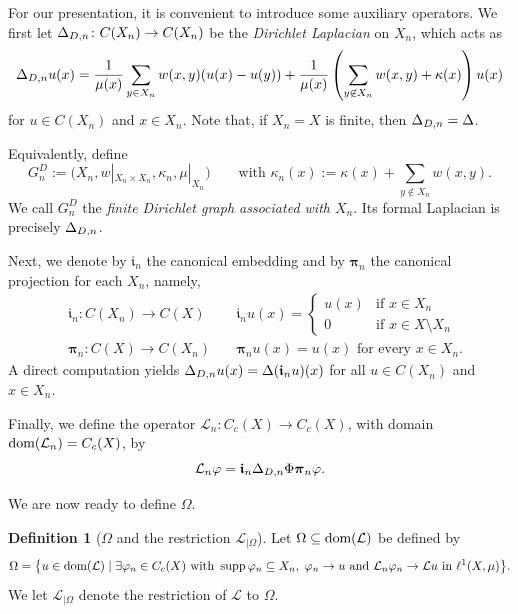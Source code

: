 \documentclass[letterpaper]{article}
\theoremstyle{definition}
\newtheorem{definition}[lemma]{Definition}
\theoremstyle{named}
\numberwithin{equation}{section}
\newcommand{\dom}{\textnormal{dom}} %
\newcommand{\Deltaphi}{\mathcal{L}}
\newcommand{\Deltaphiom}{\Deltaphi_{|\Omega}}
\newcommand{\Lmin}{\mathcal{L}_{n}}
\newcommand{\Deltadir}[1][]{\Delta_{D\ifx&#1&\else,#1\fi}}
\begin{document}
For our presentation, it is convenient to introduce some auxiliary operators. 
We first let $\Deltadir[n] \colon C(X_n) \to C(X_n)$ be the \emph{Dirichlet Laplacian} on $X_n$,
which acts as
\begin{equation}\label{def:dir_laplacian}
\Deltadir[n] u(x) = \frac{1}{\mu(x)} \sum_{y \in X_n} w(x,y) (u(x)-u(y)) +
\frac{1}{\mu(x)} \left( \sum_{y \not \in X_n} w(x,y) +\kappa(x) \right) u(x) 
\end{equation}
for $u \in C(X_n)$ and $x \in X_n$. Note that, if $X_n = X$ is finite, then $\Deltadir[n] = \Delta$.

{
Equivalently, define
\[
 G_n^{D}:=
 \bigl(X_n,w|_{X_n\times X_n},\kappa_n,\mu|_{X_n}\bigr)
 \qquad \text{with }
 \kappa_n(x):=\kappa(x)+\sum_{y\notin X_n}w(x,y).
\]
We call $G_n^{D}$ the \emph{finite Dirichlet graph associated with
$X_n$}. Its formal Laplacian is precisely $\Deltadir[n]$.
}

Next, we denote by $\boldsymbol{\mathfrak{i}}_{n}$ 
the canonical embedding and by $\boldsymbol{\pi}_n$ the canonical projection for each $X_n$, namely,
\begin{align*}
&\boldsymbol{\mathfrak{i}}_{n} \colon C(X_n)\to C(X) \quad &\boldsymbol{\mathfrak{i}}_{n}u(x) = \begin{cases}
u(x) & \mbox{if } x \in X_n\\
0   & \mbox{if } x \in X\setminus X_n
\end{cases}\\
&\boldsymbol{\pi}_n \colon C(X) \to C(X_n) \quad &\boldsymbol{\pi}_n u(x) = u(x) \mbox{ for every } x \in X_n.
\end{align*}
A direct computation yields $\Deltadir[n] u(x) = \Delta(\boldsymbol{\mathfrak{i}}_n u)(x)$ for all $u \in C(X_n)$ and $x \in X_n$.

Finally, we define the operator $\Lmin \colon C_c(X) \to C_c(X)$, with domain
$\dom(\Lmin) = C_c(X)$, by
\begin{equation}\label{eq:Deltaphi_n}
    \Lmin \varphi = \boldsymbol{\mathfrak{i}}_{n}\Deltadir[n]\Phi\boldsymbol{\pi}_{n} \varphi.
\end{equation}

We are now ready to define $\Omega$.

\begin{definition}[$\Omega$ and the restriction $\Deltaphiom$]\label{def:Omega}
Let $\Omega \subseteq \dom(\Deltaphi)$ be defined by
$$
\Omega = \bigl\{ u \in \dom(\Deltaphi) \mid \exists \varphi_n \in C_c(X) \text{ with } \operatorname{supp}\varphi_n \subseteq X_n,\; \varphi_n  \to u \textup{ and } 
\Lmin  \varphi_n \to \Deltaphi u \text{ in } \ell^1(X,\mu) \bigr\}.
$$  
We let $\Deltaphiom$ denote the restriction of $\Deltaphi$ to $\Omega$. 
\end{definition}
\end{document}

